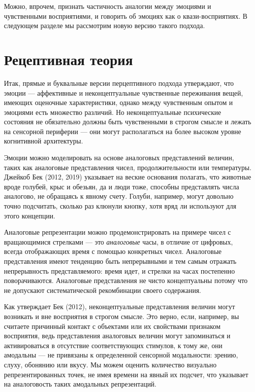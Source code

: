 \documentclass[11pt]{book}
\begin{document}
Можно, впрочем, признать частичность аналогии между эмоциями и чувственными восприятиями, и говорить об эмоциях как о квази-восприятиях. В следующем разделе мы рассмотрим новую версию такого подхода.

\section{Рецептивная теория}

Итак, прямые и буквальные версии перцептивного подхода утверждают, что эмоции --- аффективные и неконцептуальные чувственные переживания вещей, имеющих оценочные характеристики, однако между чувственным опытом и эмоциями есть множество различий. Но неконцептуальные психические состояния не обязательно должны быть чувственными в строгом смысле и лежать на сенсорной периферии --- они могут располагаться на более высоком уровне когнитивной архитектуры.

Эмоции можно моделировать на основе аналоговых представлений величин, таких как аналоговые представления чисел, продолжительности или температуры. Джейкоб Бек (2012, 2019) указывает на веские основания полагать, что животные вроде голубей, крыс и обезьян, да и люди тоже, способны представлять числа аналогово, не обращаясь к явному счету. Голуби, например, могут довольно точно подсчитать, сколько раз клюнули кнопку, хотя вряд ли используют для этого концепции.

Аналоговые репрезентации можно продемонстрировать на примере чисел с вращающимися стрелками --- это \textit{аналоговые} часы, в отличие от цифровых, всегда отображающих время с помощью конкретных чисел. Аналоговые представления имеют тенденцию быть непрерывными и тем самым отражать непрерывность представляемого: время идет, и стрелки на часах постепенно поворачиваются. Аналоговые представления не чисто концептуальны потому что не допускают систематической рекомбинации своего содержания.

Как утверждает Бек (2012), неконцептуальные представления величин могут возникать и вне восприятия в строгом смысле. Это верно, если, например, вы считаете причинный контакт с объектами или их свойствами признаком восприятия, ведь представления аналоговых величин могут запоминаться и активироваться в отсутствие соответствующих стимулов, к тому же, они амодальны --- не привязаны к определенной сенсорной модальности: зрению, слуху, обонянию или вкусу. Мы можем оценить количество визуально репрезентированных точек, не имея времени на явный их подсчет, что указывает на аналоговость таких амодальных репрезентаций.
\end{document}
